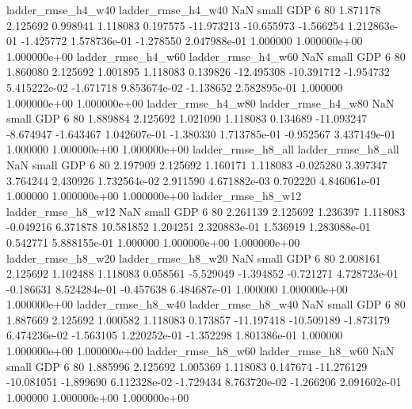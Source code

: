       ladder_rmse_h4_w40       ladder_rmse_h4_w40                   NaN      small      GDP                 6 80 1.871178       2.125692 0.998941       1.118083    0.197575    -11.973213    -10.655973    -1.566254   1.212863e-01 -1.425772 1.578736e-01    -1.278550   2.047988e-01            1.000000    1.000000e+00        1.000000e+00
      ladder_rmse_h4_w60       ladder_rmse_h4_w60                   NaN      small      GDP                 6 80 1.860080       2.125692 1.001895       1.118083    0.139826    -12.495308    -10.391712    -1.954732   5.415222e-02 -1.671718 9.853674e-02    -1.138652   2.582895e-01            1.000000    1.000000e+00        1.000000e+00
      ladder_rmse_h4_w80       ladder_rmse_h4_w80                   NaN      small      GDP                 6 80 1.889884       2.125692 1.021090       1.118083    0.134689    -11.093247     -8.674947    -1.643467   1.042607e-01 -1.380330 1.713785e-01    -0.952567   3.437149e-01            1.000000    1.000000e+00        1.000000e+00
      ladder_rmse_h8_all       ladder_rmse_h8_all                   NaN      small      GDP                 6 80 2.197909       2.125692 1.160171       1.118083   -0.025280      3.397347      3.764244     2.430926   1.732564e-02  2.911590 4.671882e-03     0.702220   4.846061e-01            1.000000    1.000000e+00        1.000000e+00
      ladder_rmse_h8_w12       ladder_rmse_h8_w12                   NaN      small      GDP                 6 80 2.261139       2.125692 1.236397       1.118083   -0.049216      6.371878     10.581852     1.204251   2.320883e-01  1.536919 1.283088e-01     0.542771   5.888155e-01            1.000000    1.000000e+00        1.000000e+00
      ladder_rmse_h8_w20       ladder_rmse_h8_w20                   NaN      small      GDP                 6 80 2.008161       2.125692 1.102488       1.118083    0.058561     -5.529049     -1.394852    -0.721271   4.728723e-01 -0.186631 8.524284e-01    -0.457638   6.484687e-01            1.000000    1.000000e+00        1.000000e+00
      ladder_rmse_h8_w40       ladder_rmse_h8_w40                   NaN      small      GDP                 6 80 1.887669       2.125692 1.000582       1.118083    0.173857    -11.197418    -10.509189    -1.873179   6.474236e-02 -1.563105 1.220252e-01    -1.352298   1.801386e-01            1.000000    1.000000e+00        1.000000e+00
      ladder_rmse_h8_w60       ladder_rmse_h8_w60                   NaN      small      GDP                 6 80 1.885996       2.125692 1.005369       1.118083    0.147674    -11.276129    -10.081051    -1.899690   6.112328e-02 -1.729434 8.763720e-02    -1.266206   2.091602e-01            1.000000    1.000000e+00        1.000000e+00
